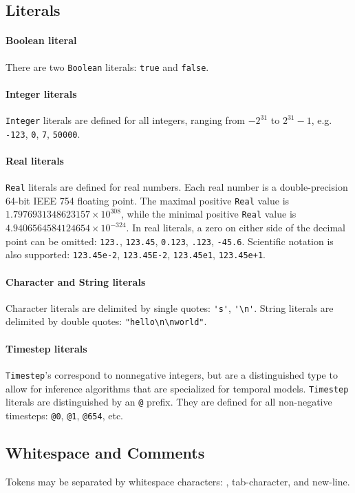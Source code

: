 \documentclass[12pt]{article}
\begin{document}
\subsection{Literals}
\paragraph{Boolean literal}

There are two \verb|Boolean| literals: \verb|true| and \verb|false|. 

\paragraph{Integer literals}
\verb|Integer| literals are defined for all integers, ranging from $-2^{31}$ to $2^{31}-1$, e.g. \verb|-123|, \verb|0|,
\verb|7|, \verb|50000|.

\paragraph{Real literals}
\verb|Real| literals are defined for real numbers. Each real number is a double-precision 64-bit IEEE 754 floating point. The maximal positive \verb|Real| value is $1.7976931348623157 × 10^{308}$, while the minimal positive \verb|Real| value is $4.9406564584124654 × 10^{−324}$. 
In real literals, a zero on either side of the decimal point can be omitted: \verb|123.|, \verb|123.45|, \verb|0.123|,
\verb|.123|, \verb|-45.6|. Scientific notation is also supported:
\verb|123.45e-2|, \verb|123.45E-2|, \verb|123.45e1|, \verb|123.45e+1|.


\paragraph{Character and String literals}
Character literals are delimited by single quotes: \verb|'s'|, \verb|'\n'|.
String literals are delimited by double quotes: \verb|"hello\n\nworld"|.

\paragraph{Timestep literals}
\verb|Timestep|'s correspond to nonnegative integers, but are a distinguished type
to allow for inference algorithms that are specialized for temporal models. 
\verb|Timestep| literals are distinguished by an \verb|@| prefix. They are defined for all non-negative timesteps: \verb|@0|, \verb|@1|, \verb|@654|, etc.

\subsection{Whitespace and Comments}
Tokens may be separated by whitespace characters: \textvisiblespace, tab-character, and new-line. 
\end{document}
